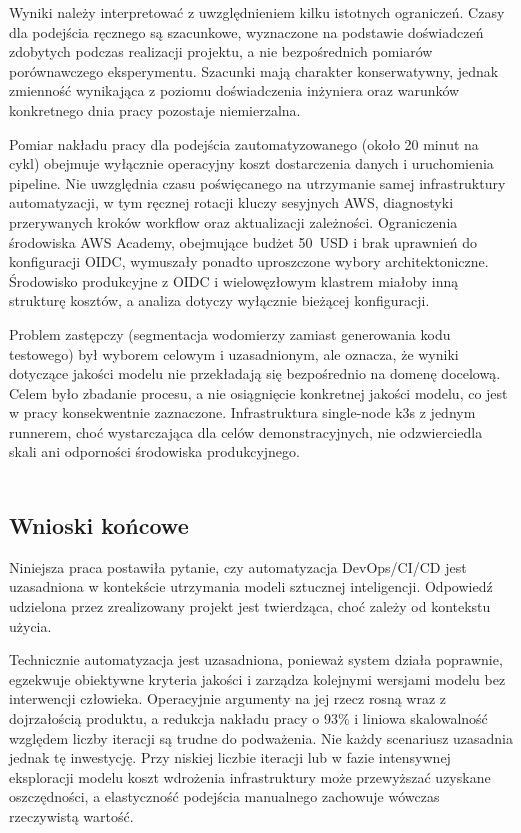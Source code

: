 Wyniki należy interpretować z uwzględnieniem kilku istotnych ograniczeń. Czasy dla podejścia ręcznego są szacunkowe, wyznaczone na podstawie doświadczeń zdobytych podczas realizacji projektu, a nie bezpośrednich pomiarów porównawczego eksperymentu. Szacunki mają charakter konserwatywny, jednak zmienność wynikająca z poziomu doświadczenia inżyniera oraz warunków konkretnego dnia pracy pozostaje niemierzalna.

Pomiar nakładu pracy dla podejścia zautomatyzowanego (około 20 minut na cykl) obejmuje wyłącznie operacyjny koszt dostarczenia danych i uruchomienia pipeline. Nie uwzględnia czasu poświęcanego na utrzymanie samej infrastruktury automatyzacji, w tym ręcznej rotacji kluczy sesyjnych AWS, diagnostyki przerywanych kroków workflow oraz aktualizacji zależności. Ograniczenia środowiska AWS Academy, obejmujące budżet 50~USD i brak uprawnień do konfiguracji OIDC, wymuszały ponadto uproszczone wybory architektoniczne. Środowisko produkcyjne z OIDC i wielowęzłowym klastrem miałoby inną strukturę kosztów, a analiza dotyczy wyłącznie bieżącej konfiguracji.

Problem zastępczy (segmentacja wodomierzy zamiast generowania kodu testowego) był wyborem celowym i uzasadnionym, ale oznacza, że wyniki dotyczące jakości modelu nie przekładają się bezpośrednio na domenę docelową. Celem było zbadanie procesu, a nie osiągnięcie konkretnej jakości modelu, co jest w pracy konsekwentnie zaznaczone. Infrastruktura single-node k3s z jednym runnerem, choć wystarczająca dla celów demonstracyjnych, nie odzwierciedla skali ani odporności środowiska produkcyjnego.
\mbox{}\\\\
\subsection{Wnioski końcowe}

Niniejsza praca postawiła pytanie, czy automatyzacja DevOps/CI/CD jest uzasadniona w kontekście utrzymania modeli sztucznej inteligencji. Odpowiedź udzielona przez zrealizowany projekt jest twierdząca, choć zależy od kontekstu użycia.

Technicznie automatyzacja jest uzasadniona, ponieważ system działa poprawnie, egzekwuje obiektywne kryteria jakości i zarządza kolejnymi wersjami modelu bez interwencji człowieka. Operacyjnie argumenty na jej rzecz rosną wraz z dojrzałością produktu, a redukcja nakładu pracy o 93\% i liniowa skalowalność względem liczby iteracji są trudne do podważenia. Nie każdy scenariusz uzasadnia jednak tę inwestycję. Przy niskiej liczbie iteracji lub w fazie intensywnej eksploracji modelu koszt wdrożenia infrastruktury może przewyższać uzyskane oszczędności, a elastyczność podejścia manualnego zachowuje wówczas rzeczywistą wartość.

